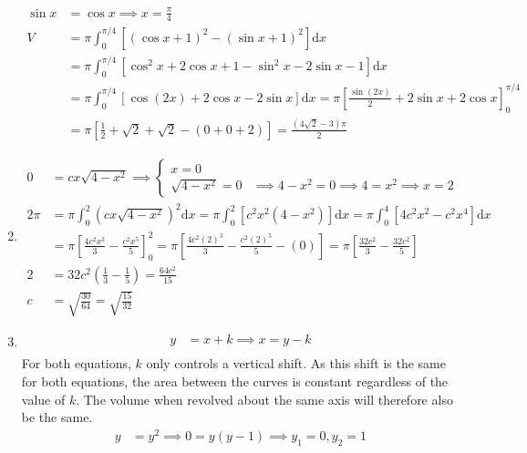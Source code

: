 \documentclass[12pt, A4]{report}
\renewcommand{\d}{\text{d}}
\begin{document}
\begin{enumerate}
					\begin{align*}
						\sin x &= \cos x 
								\implies x = \frac{\pi}{4} \\
						V &= \pi\int_0^{\pi/4}\left[(\cos x + 1)^2 - (\sin x + 1)^2\right]\d x \\
							&= \pi\int_0^{\pi/4}\left[\cos^2x + 2\cos x + 1 - \sin^2 x - 2\sin x - 1\right]\d x \\
							&= \pi\int_0^{\pi/4}\left[\cos(2x) + 2\cos x - 2\sin x\right]\d x
								= \pi\left[\frac{\sin(2x)}{2} + 2\sin x + 2\cos x\right]_0^{\pi/4} \\
							&= \pi\left[\frac{1}{2} + \sqrt{2} + \sqrt{2} - (0 + 0 + 2)\right]
								= \frac{(4\sqrt{2} - 3)\pi}{2}
					\end{align*}
				\item
					\begin{align*}
						0 &= cx\sqrt{4 - x^2} \implies 
							\begin{cases}
	 							x = 0 \\
	 							\sqrt{4 - x^2} = 0 &\implies 4 - x^2 = 0 
	 								\implies 4 = x^2 
	 								\implies x = 2
							\end{cases} \\
						2\pi &= \pi\int_0^2\left(cx\sqrt{4 - x^2}\right)^2\d x
									= \pi\int_0^2\left[c^2x^2(4 - x^2)\right]\d x
									= \pi\int_0^4\left[4c^2x^2 - c^2x^4\right]\d x \\
								&= \pi\left[\frac{4c^2x^3}{3} - \frac{c^2x^5}{5}\right]_0^2
									= \pi\left[\frac{4c^2(2)^3}{3} - \frac{c^2(2)^5}{5} - (0)\right]
									= \pi\left[\frac{32c^2}{3} - \frac{32c^2}{5}\right] \\
							2 &= 32c^2\left(\frac{1}{3} - \frac{1}{5}\right) 
									= \frac{64c^2}{15} \\
							c &= \sqrt{\frac{30}{64}} = \sqrt{\frac{15}{32}}
					\end{align*}
				\item
					\begin{align*}
						y &= x + k
								\implies x = y - k \\
					\end{align*}
					For both equations, $k$ only controls a vertical shift. As this shift is the same for both equations, the area between the curves is constant regardless of the value of $k$. The volume when revolved about the same axis will therefore also be the same.
					\begin{align*}
						y &= y^2 
								\implies 0 = y(y - 1) 
								\implies y_1 = 0, y_2 = 1 \tag{$k = 0$} \\

\end{align*}
\end{enumerate}
\end{document}
